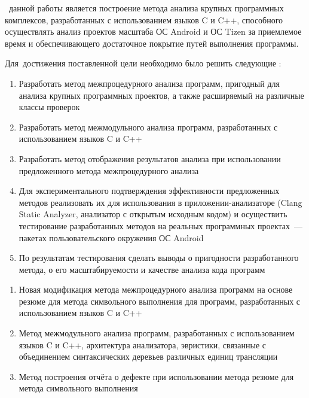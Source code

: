 \aim\ данной работы является построение метода анализа крупных программных комплексов, разработанных с использованием языков C и C++, способного осуществлять анализ проектов масштаба ОС Android и ОС Tizen  за приемлемое время и обеспечивающего достаточное покрытие путей выполнения программы.

Для~достижения поставленной цели необходимо было решить следующие {\tasks}:
\begin{enumerate}
  \item Разработать метод межпроцедурного анализа программ, пригодный для анализа крупных программных проектов, а также расширяемый на различные классы проверок
  \item Разработать метод межмодульного анализа программ, разработанных с использованием языков C и C++
  \item Разработать метод отображения результатов анализа при использовании предложенного метода межпроцедурного анализа
  \item Для экспериментального подтверждения эффективности предложенных методов реализовать их для использования в приложении-анализаторе (Clang Static Analyzer, анализатор с открытым исходным кодом) и осуществить тестирование разработанных методов на реальных программных проектах~--- пакетах пользовательского окружения ОС Android
  \item По результатам тестирования сделать выводы о пригодности разработанного метода, о его масштабируемости и качестве анализа кода программ
\end{enumerate}

\begin{enumerate}
  \item Новая модификация метода межпроцедурного анализа программ на основе резюме для метода символьного выполнения для программ, разработанных с использованием языков C и C++
  \item Метод межмодульного анализа программ, разработанных с использованием языков C и C++, архитектура анализатора, эвристики, связанные с объединением синтаксических деревьев различных единиц трансляции
  \item Метод построения отчёта о дефекте при использовании метода резюме для метода символьного выполнения
\end{enumerate}

\novelty


